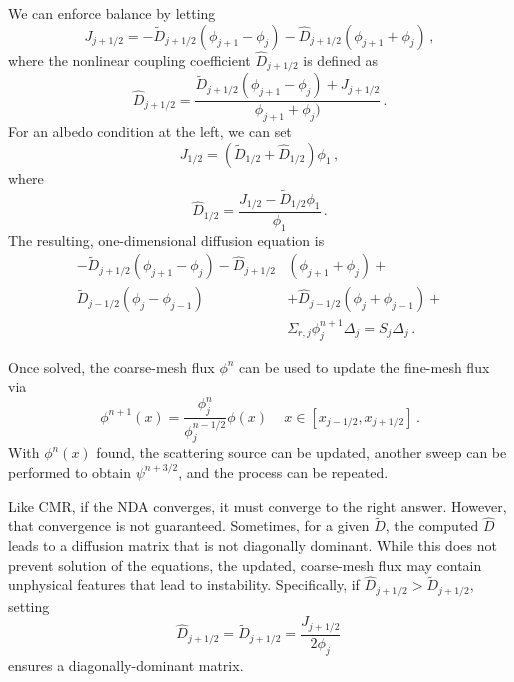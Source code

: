 We can enforce balance by letting
\begin{equation}
 J_{j+1/2} = -\tilde{D}_{j+1/2} (\phi_{j+1}-\phi_j) - \hat{D}_{j+1/2}(\phi_{j+1}+\phi_j) \, ,
\end{equation}
where the nonlinear coupling coefficient $\hat{D}_{j+1/2}$ is 
defined as
\begin{equation}
 \hat{D}_{j+1/2} = \frac{\tilde{D}_{j+1/2} (\phi_{j+1}-\phi_j) + J_{j+1/2}}{\phi_{j+1}+\phi_j)} \, .
\end{equation}
For an albedo condition at the left, we can set 
\begin{equation}
 J_{1/2} = (\tilde{D}_{1/2}+\hat{D}_{1/2})\phi_1 \, ,
\end{equation}
where 
\begin{equation}
 \hat{D}_{1/2} = \frac{J_{1/2}-\tilde{D}_{1/2} \phi_1}{\phi_1} \, .
\end{equation}
The resulting, one-dimensional diffusion equation is
\begin{equation}
\begin{split}
 -\tilde{D}_{j+1/2}(\phi_{j+1}-\phi_j) - \hat{D}_{j+1/2} & (\phi_{j+1}+\phi_j)  + \\
 \tilde{D}_{j-1/2}(\phi_{j}-\phi_{j-1})& + \hat{D}_{j-1/2} (\phi_{j}+\phi_{j-1}) + \\
  & \Sigma_{r,j} \phi_{j}^{n+1} \Delta_j = S_j \Delta_j \, .
\end{split}
\end{equation}



Once solved, the coarse-mesh flux $\phi^n$ can be used to 
update the fine-mesh flux via 
\begin{equation}
 \phi^{n+1}(x) = \frac{\phi^{n}_{j}}{\phi^{n-1/2}_j} \phi(x) \, \quad x \in [x_{j-1/2},x_{j+1/2}] \, .
\end{equation}
With $\phi^{n}(x)$ found, the scattering source can be updated,  another 
sweep can be performed to obtain $\psi^{n+3/2}$, and the
process can be repeated. 


Like CMR, if the NDA converges, it must converge to 
the right answer.  However, that convergence is not guaranteed.
Sometimes, for a given $\tilde{D}$, the computed $\hat{D}$ leads to 
a diffusion matrix that is not diagonally dominant.  While this does 
not prevent solution of the equations, the updated, coarse-mesh flux 
may contain unphysical features that lead to instability.  
Specifically, if $\hat{D}_{j+1/2} > \tilde{D}_{j+1/2}$, setting
\begin{equation}
 \hat{D}_{j+1/2} = \tilde{D}_{j+1/2} = \frac{J_{j+1/2}}{2\phi_j} \, 
\end{equation}
ensures a diagonally-dominant matrix.

